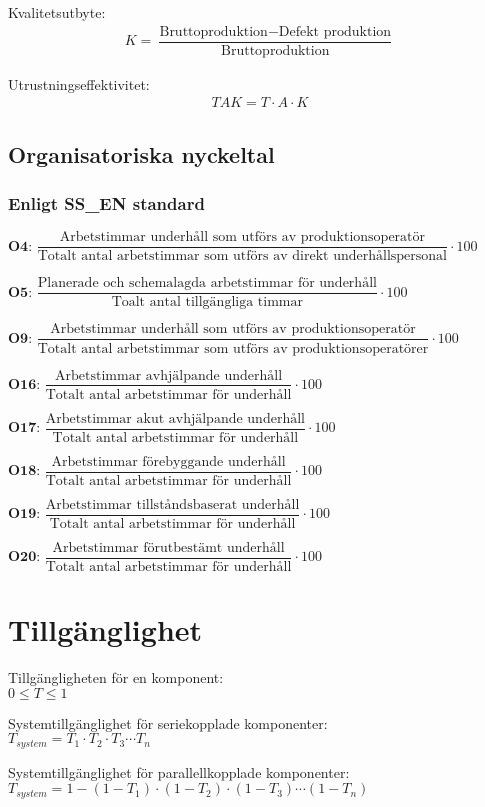       Kvalitetsutbyte:  
      \begin{align*}
			K = \dfrac{\text{Bruttoproduktion} -\text{Defekt produktion}}{\text{Bruttoproduktion}}
      \end{align*}
				
		 Utrustningseffektivitet:  
      \begin{align*}
			TAK = T \cdot A \cdot K
      \end{align*}
			
\subsection*{Organisatoriska nyckeltal}
		\subsubsection*{Enligt SS\_EN standard}
		$\textbf{O4: } \dfrac{\text{Arbetstimmar underhåll som utförs av produktionsoperatör}}{\text{Totalt antal arbetstimmar som utförs av direkt underhållspersonal}} \cdot 100$

		$\textbf{O5: } \dfrac{\text{Planerade och schemalagda arbetstimmar för underhåll}}{\text{Toalt antal tillgängliga timmar}} \cdot 100$
		
		$\textbf{O9: } \dfrac{\text{Arbetstimmar underhåll som utförs av produktionsoperatör}}{\text{Totalt antal arbetstimmar som utförs av produktionsoperatörer}} \cdot 100$
		
		$\textbf{O16: } \dfrac{\text{Arbetstimmar avhjälpande underhåll}}{\text{Totalt antal arbetstimmar för underhåll}} \cdot 100$
		
		$\textbf{O17: } \dfrac{\text{Arbetstimmar akut avhjälpande underhåll}}{\text{Totalt antal arbetstimmar för underhåll}} \cdot 100$
		
		$\textbf{O18: } \dfrac{\text{Arbetstimmar förebyggande underhåll}}{\text{Totalt antal arbetstimmar för underhåll}} \cdot 100$
		
		$\textbf{O19: } \dfrac{\text{Arbetstimmar tillståndsbaserat underhåll}}{\text{Totalt antal arbetstimmar för underhåll}} \cdot 100$
		
		$\textbf{O20: } \dfrac{\text{Arbetstimmar förutbestämt underhåll}}{\text{Totalt antal arbetstimmar för underhåll}} \cdot 100$
\section*{Tillgänglighet}
			Tillgängligheten för en komponent: \\ 
      $ 0 \leqslant T \leqslant 1 $
			
			Systemtillgänglighet för seriekopplade komponenter:  \\ 
      $T_{system} = T_1 \cdot T_2 \cdot T_3 \cdots T_n$ 
			
			Systemtillgänglighet för parallellkopplade komponenter:  \\ 
      $ T_{system} = 1- \left(1 - T_1 \right) \cdot  \left(1 - T_2 \right) \cdot  \left(1 - T_3 \right) \cdots  \left(1 - T_n \right)$ 
